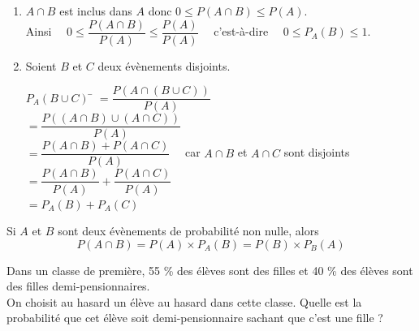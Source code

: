 \documentclass[a4paper,11pt,cours]{nsi} %
\begin{document}
\begin{demonstration}
\begin{enumerate}
		
		\item 	$A \cap B$ est inclus dans $A$ donc $0\leqslant P(A\cap B) \leqslant P(A)$.\\[0.5em]
			Ainsi $\quad 0 \leqslant	\dfrac{P(A \cap B)}{P(A)} \leqslant	\dfrac{P(A)}{P(A)} \quad$ c'est-à-dire $\quad 0\leqslant P_A(B) \leqslant 1$.
		\item	Soient $B$ et $C$ deux évènements disjoints.
		\begin{center}
		\end{center}
		\begin{tabbing}
			$P_A(B\cup C)$ \= $=\dfrac{P(A\cap (B \cup C))}{P(A)}$\\[0.5em]
			\>	$=\dfrac{P((A\cap B)\cup (A\cap C))}{P(A)}$\\[0.5em]
			\>	$=\dfrac{P(A\cap B)+P(A\cap C)}{P(A)}\quad$ car $A\cap B$ et $A\cap C$ sont disjoints\\[0.5em]
			\>	$=\dfrac{P(A \cap B)}{P(A)}+\dfrac{P(A\cap C)}{P(A)}$\\[0.5em]
			\>	$=P_A(B)+P_A(C)$
		\end{tabbing}
	\end{enumerate}
\end{demonstration}

\begin{propriete}[ ]
	Si $A$ et $B$ sont deux évènements de probabilité non nulle, alors 
	$$P(A\cap B)=P(A)\times P_A(B)=P(B) \times P_B(A)$$
\end{propriete}

\begin{exercice}[]
	Dans un classe de première, 55 \% des élèves sont des filles et 40 \% des élèves sont des filles demi-pensionnaires.\\
	On choisit au hasard un élève au hasard dans cette classe. Quelle est la probabilité que cet élève soit demi-pensionnaire sachant que c'est une fille ?\\[.5em]
	\\
\end{exercice}
\end{document}

